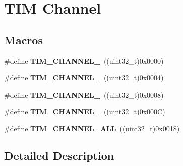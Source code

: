 \hypertarget{group___t_i_m___channel}{\section{T\-I\-M Channel}
\label{group___t_i_m___channel}
}
\subsection*{Macros}
\begin{DoxyCompactItemize}
\item 
\hypertarget{group___t_i_m___channel_ga6b1541e4a49d62610899e24bf23f4879}{\#define {\bfseries T\-I\-M\-\_\-\-C\-H\-A\-N\-N\-E\-L\-\_}~((uint32\-\_\-t)0x0000)}\label{group___t_i_m___channel_ga6b1541e4a49d62610899e24bf23f4879}

\item 
\hypertarget{group___t_i_m___channel_ga33e02d43345a7ac5886f01b39e4f7ccd}{\#define {\bfseries T\-I\-M\-\_\-\-C\-H\-A\-N\-N\-E\-L\-\_}~((uint32\-\_\-t)0x0004)}\label{group___t_i_m___channel_ga33e02d43345a7ac5886f01b39e4f7ccd}

\item 
\hypertarget{group___t_i_m___channel_ga4ea100c1789b178f3cb46721b7257e2d}{\#define {\bfseries T\-I\-M\-\_\-\-C\-H\-A\-N\-N\-E\-L\-\_}~((uint32\-\_\-t)0x0008)}\label{group___t_i_m___channel_ga4ea100c1789b178f3cb46721b7257e2d}

\item 
\hypertarget{group___t_i_m___channel_gad59ef74820ee8bf77fa1f8d589fde2ac}{\#define {\bfseries T\-I\-M\-\_\-\-C\-H\-A\-N\-N\-E\-L\-\_}~((uint32\-\_\-t)0x000\-C)}\label{group___t_i_m___channel_gad59ef74820ee8bf77fa1f8d589fde2ac}

\item 
\hypertarget{group___t_i_m___channel_ga6abf8f9fc695b79d8781ca082dfb48bc}{\#define {\bfseries T\-I\-M\-\_\-\-C\-H\-A\-N\-N\-E\-L\-\_\-\-A\-L\-L}~((uint32\-\_\-t)0x0018)}\label{group___t_i_m___channel_ga6abf8f9fc695b79d8781ca082dfb48bc}

\end{DoxyCompactItemize}


\subsection{Detailed Description}
